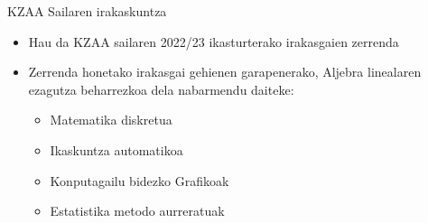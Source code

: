 \documentclass[
 10pt,%
 compress,%
 t,       %
 xcolor=svgnames
]{beamer}
\theoremstyle{definition} \newtheorem{definicion}{Definicion}[section]
\theoremstyle{propiedades} \newtheorem{propiedades}{Propiedades}[section]
\begin{document}
\begin{frame}{KZAA Sailaren irakaskuntza}
{\begin{itemize}
\medskip


\item Hau da KZAA sailaren 2022/23 ikasturterako irakasgaien zerrenda

\item  Zerrenda honetako irakasgai gehienen garapenerako, Aljebra linealaren ezagutza beharrezkoa dela nabarmendu daiteke:


\begin{itemize}
	\item Matematika diskretua
	\item Ikaskuntza automatikoa
	\item Konputagailu bidezko Grafikoak
	\item Estatistika metodo aurreratuak
\end{itemize}

\end{itemize}


}

\end{frame}




\end{document}
